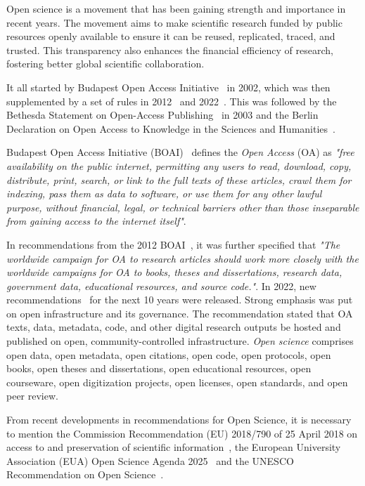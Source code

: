 \documentclass{article}
\begin{document}
Open science is a movement that has been gaining strength and importance in recent years.
The movement aims to make scientific research funded by public resources openly available to ensure it can be reused, replicated, traced, and trusted. This transparency also enhances the financial efficiency of research, fostering better global scientific collaboration.

It all started by Budapest Open Access Initiative~\cite{2012_OSI} in 2002, which was then supplemented by a set of rules in 2012~\cite{2012_OSI} and 2022~\cite{2022_OSI}.  This was followed by the Bethesda Statement on Open-Access Publishing~\cite{2003_Bethesda} in 2003 and the Berlin Declaration on Open Access to Knowledge in the Sciences and Humanities~\cite{2003_Max_Planck}.

Budapest Open Access Initiative (BOAI)~\cite{2002_OSI} defines the \textit{Open Access} (OA) as \textit{"free availability on the public internet, permitting any users to read, download, copy, distribute, print, search, or link to the full texts of these articles, crawl them for indexing, pass them as data to software, or use them for any other lawful purpose, without financial, legal, or technical barriers other than those inseparable from gaining access to the internet itself"}.

In recommendations from the 2012 BOAI~\cite{2012_OSI}, it was further specified that \textit{"The worldwide campaign for OA to research articles should work more closely with the worldwide campaigns for OA to books, theses and dissertations, research data, government data, educational resources, and source code."}. In 2022, new recommendations~\cite{2022_OSI} for the next 10 years were released. Strong emphasis was put on open infrastructure and its governance. The recommendation stated that OA texts, data, metadata, code, and other digital research outputs be hosted and published on open, community-controlled infrastructure. \textit{Open science} comprises open data, open metadata, open citations, open code, open protocols, open books, open theses and dissertations, open educational resources, open courseware, open digitization projects, open licenses, open standards, and open peer review.

From recent developments in recommendations for Open Science, it is necessary to mention the Commission Recommendation (EU) 2018/790 of 25 April 2018 on access to and preservation of scientific information~\cite{2018_EU_2018/790}, the European University Association (EUA) Open Science Agenda 2025~\cite{2022_EUA} and the UNESCO Recommendation on Open Science~\cite{2021_UNESCO}.
\end{document}
